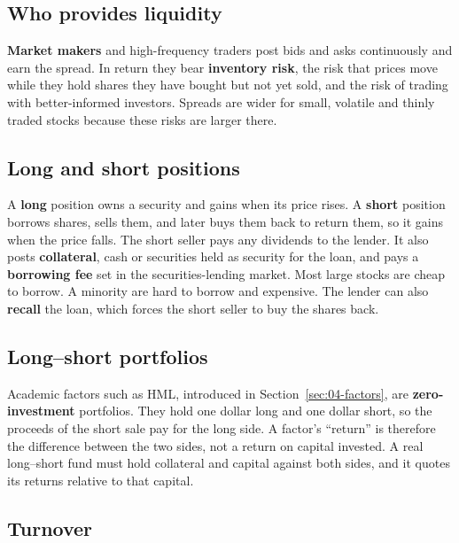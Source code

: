 \subsection{Who provides liquidity}

\textbf{Market makers} and high-frequency traders post bids and asks continuously and earn the spread. In return they bear \textbf{inventory risk}, the risk that prices move while they hold shares they have bought but not yet sold, and the risk of trading with better-informed investors. Spreads are wider for small, volatile and thinly traded stocks because these risks are larger there.

\subsection{Long and short positions}

A \textbf{long} position owns a security and gains when its price rises. A \textbf{short} position borrows shares, sells them, and later buys them back to return them, so it gains when the price falls. The short seller pays any dividends to the lender. It also posts \textbf{collateral}, cash or securities held as security for the loan, and pays a \textbf{borrowing fee} set in the securities-lending market. Most large stocks are cheap to borrow. A minority are hard to borrow and expensive. The lender can also \textbf{recall} the loan, which forces the short seller to buy the shares back.

\subsection{Long--short portfolios}

Academic factors such as HML, introduced in Section~\ref{sec:04-factors}, are \textbf{zero-investment} portfolios. They hold one dollar long and one dollar short, so the proceeds of the short sale pay for the long side. A factor's ``return'' is therefore the difference between the two sides, not a return on capital invested. A real long--short fund must hold collateral and capital against both sides, and it quotes its returns relative to that capital.

\subsection{Turnover}

